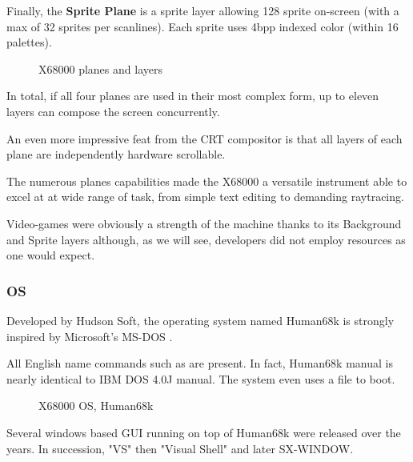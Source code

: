 Finally, the \textbf{Sprite Plane} is a sprite layer allowing 128 sprite on-screen (with a max of 32 sprites per scanlines). Each sprite uses 4bpp indexed color (within 16 palettes).


 \begin{figure}[H]
\caption*{X68000 planes and layers}
\end{figure}



In total, if all four planes are used in their most complex form, up to eleven layers can compose the screen concurrently. 

An even more impressive feat from the CRT compositor is that all layers of each plane are independently hardware scrollable.

The numerous planes capabilities made the X68000 a versatile instrument able to excel at at wide range of task, from simple text editing to demanding raytracing. 

Video-games were obviously a strength of the machine thanks to its Background and Sprite layers although, as we will see, developers did not employ resources as one would expect.








\subsubsection{OS}
Developed by Hudson Soft, the operating system named Human68k is strongly inspired by Microsoft's MS-DOS . 

All English name commands such as  are present. In fact, Human68k manual is nearly identical to IBM DOS 4.0J manual\cite{human68k_manual}. The system even uses a  file to boot.

\begin{figure}[H]
\caption*{X68000 OS, Human68k}
\end{figure}


Several windows based GUI running on top of Human68k were released over the years. In succession, "VS" then "Visual Shell" and later SX-WINDOW.


